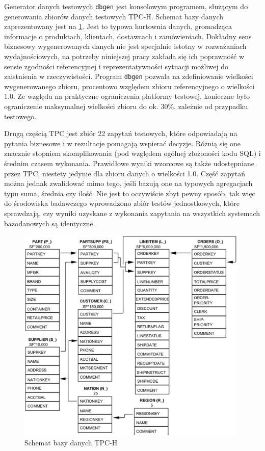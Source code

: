 \documentclass[12pt]{extarticle}
\begin{document}
    Generator danych testowych \texttt{dbgen} jest konsolowym programem, służącym do generowania zbiorów danych testowych TPC-H. Schemat bazy danych zaprezentowany jest na \ref{fig:tpcschema}. Jest to typowa hurtownia danych, gromadząca informacje o produktach, klientach, dostawcach i zamówieniach. Dokładny sens biznesowy wygenerowanych danych nie jest specjalnie istotny w rozważaniach wydajnościowych, na potrzeby niniejszej pracy zakłada się ich poprawność w sensie zgodności referencyjnej i reprezentatywności sytuacji możliwej do zaistnienia w rzeczywistości. Program \texttt{dbgen} pozwala na zdefiniowanie wielkości wygenerowanego zbioru, procentowo względem zbioru referencyjnego o wielkości 1.0. Ze względu na praktyczne ograniczenia platformy testowej, konieczne było ograniczenie maksymalnej wielkości zbioru do ok. 30\%, zależnie od przypadku testowego. 

    Drugą częścią TPC jest zbiór 22 zapytań testowych, które odpowiadają na pytania biznesowe i w rezultacje pomagają wspierać decyzje. Różnią się one znacznie stopniem skomplikowania (pod względem ogólnej złożoności kodu SQL) i średnim czasem wykonania. Prawidłowe wyniki wzorcowe są także udostępniane przez TPC, niestety jedynie dla zbioru danych o wielkości 1.0. Część zapytań można jednak zwalidować mimo tego, jeśli bazują one na typowych agregacjach typu suma, średnia czy ilość. Nie jest to oczywiście zbyt pewny sposób, tak więc do środowiska badawczego wprowadzono zbiór testów jednostkowych, które sprawdzają, czy wyniki uzyskane z wykonania zapytania na wszystkich systemach bazodanowych są identyczne.


\begin{figure}[h]
\centering
\includegraphics[width=11cm]{tpc-schema.png}
\caption{Schemat bazy danych TPC-H}
\label{fig:tpcschema}
\end{figure}
\end{document}
